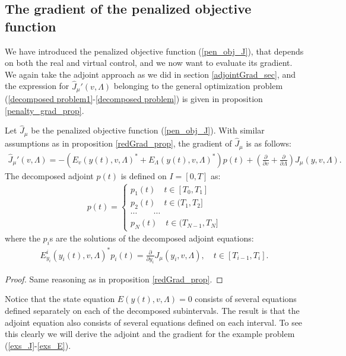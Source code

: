 \subsection{The gradient of the penalized objective function}
We have introduced the penalized objective function (\ref{pen_obj_J}), that depends on both the real and virtual control, and we now want to evaluate its gradient. We again take the adjoint approach as we did in section \ref{adjointGrad_sec}, and the expression for $\hat J_{\mu}'(v,\Lambda)$ belonging to the general optimization problem (\ref{decomposed problem1}-\ref{decomposed problem}) is given in proposition \ref{penalty_grad_prop}.
\begin{proposition} \label{penalty_grad_prop}
Let $\hat J_{\mu}$ be the penalized objective function (\ref{pen_obj_J}). With similar assumptions as in proposition \ref{redGrad_prop}, the gradient of $\hat J_{\mu}$ is as follows: 
\begin{align}
\hat J_{\mu}'(v,\Lambda)=-(E_v(y(t),v,\Lambda)^*+E_{\Lambda}(y(t),v,\Lambda)^*)p(t)+ (\frac{\partial}{\partial v}+\frac{\partial}{\partial\Lambda})J_{\mu}(y,v,\Lambda). \label{pen_abs_grad}
\end{align}
The decomposed adjoint $p(t)$ is defined on $I=[0,T]$ as:
\begin{align}
 p(t)=\left\{
     \begin{array}{lr}
		p_1(t)\quad t\in [T_0,T_1] \\
		p_2(t)\quad t\in(T_1,T_2] \\
		\cdots \quad\quad\cdots\\
		p_N(t)\quad t\in(T_{N-1},T_N]
	\end{array}
   \right.	\label{GatherAdjoint}
\end{align}
where the $p_i$s are the solutions of the decomposed adjoint equations:
\begin{align}
E_{y_i}^i(y_i(t),v,\Lambda)^{*}p_i(t)=\frac{\partial}{\partial y_i}J_{\mu}(y_i,v,\Lambda), \quad t\in [T_{i-1},T_i]. \label{penalty adjoint}
\end{align}
\end{proposition}
\begin{proof}
Same reasoning as in proposition \ref{redGrad_prop}.
\end{proof}
\noindent
Notice that the state equation $E(y(t),v,\Lambda)=0$ consists of several equations defined separately on each of the decomposed subintervals. The result is that the adjoint equation also consists of several equations defined on each interval. To see this clearly we will derive the adjoint and the gradient for the example problem (\ref{exs_J}-\ref{exs_E}).

